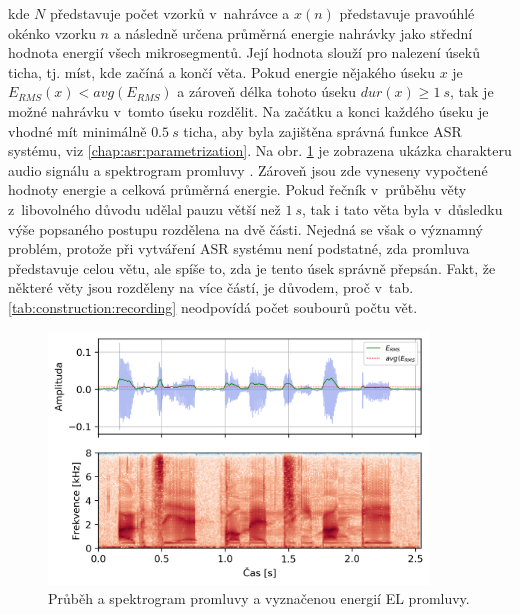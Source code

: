 \noindent kde $N$ představuje počet vzorků v~nahrávce a $x(n)$ představuje pravoúhlé okénko vzorku $n$ a následně určena průměrná energie nahrávky jako střední hodnota energií všech mikrosegmentů.
Její hodnota slouží pro nalezení úseků ticha, tj. míst, kde začíná a končí věta.
Pokud energie nějakého úseku $x$ je $E_{RMS}(x) < avg(E_{RMS})$ a zároveň délka tohoto úseku $dur(x) \geq 1\ s$, tak je možné nahrávku v~tomto úseku rozdělit. Na začátku a konci každého úseku je vhodné mít minimálně $0.5\ s$ ticha, aby byla zajištěna správná funkce ASR systému, viz \ref{chap:asr:parametrization}.
Na obr. \ref{fig:construction:el_speech} je zobrazena ukázka charakteru audio signálu a spektrogram promluvy \textit{}.
Zároveň jsou zde vyneseny vypočtené hodnoty energie a celková průměrná energie.
Pokud řečník v~průběhu věty z~libovolného důvodu udělal pauzu větší než $1\ s$, tak i tato věta byla v~důsledku výše popsaného postupu rozdělena na dvě části.
Nejedná se však o významný problém, protože při vytváření ASR systému není podstatné, zda promluva představuje celou větu, ale spíše to, zda je tento úsek správně přepsán.
Fakt, že některé věty jsou rozděleny na více částí, je důvodem, proč v~tab. \ref{tab:construction:recording} neodpovídá počet soubourů počtu vět.

\begin{figure}[hbpt]
  \centering
  \includegraphics[width=0.9\textwidth]{./ch5-construction/img/energy_spec_el.png}
  \caption[Průběh a spektrogram EL promluvy.]{Průběh a spektrogram promluvy a vyznačenou energií EL promluvy.}
  \label{fig:construction:el_speech}
\end{figure}

